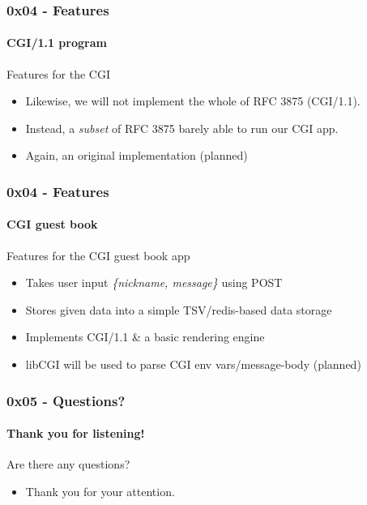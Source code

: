 \documentclass {beamer}
\begin{document}
\begin{frame}
  \frametitle{0x04 - Features}
  \framesubtitle{CGI/1.1 program}

  Features for the CGI

  \begin{itemize}
    \item<1-> Likewise, we will not implement the whole of RFC 3875 (CGI/1.1).
    \item<2-> Instead, a \textit{subset} of RFC 3875 barely able to run our CGI app.
    \item<3-> Again, an original implementation (planned)
  \end{itemize}
\end{frame}

\begin{frame}
  \frametitle{0x04 - Features}
  \framesubtitle{CGI guest book}

  Features for the CGI guest book app
  \begin{itemize}
    \item<1-> Takes user input \textit{\{nickname, message\}} using POST
    \item<2-> Stores given data into a simple TSV/redis-based data storage
    \item<3-> Implements CGI/1.1 \& a basic rendering engine
    \item<3-> libCGI will be used to parse CGI env vars/message-body (planned)
  \end{itemize}
\end{frame}

\begin{frame}
  \frametitle{0x05 - Questions?}
  \framesubtitle{Thank you for listening!}

  Are there any questions?
  \begin{itemize}
    \item<1-> Thank you for your attention.
  \end{itemize}
\end{frame}
\end{document}
